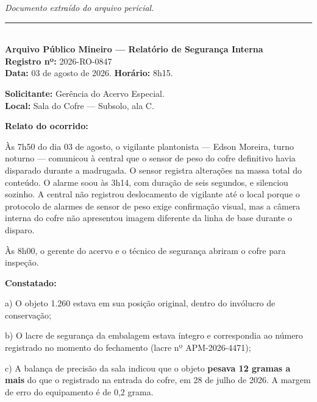 
\noindent \textit{Documento extraído do arquivo pericial.}

\vspace{0.5em}\noindent\rule{\textwidth}{0.5pt}\vspace{0.5em}

\\[-0.2em]

\noindent \textbf{Arquivo Público Mineiro --- Relatório de Segurança Interna}\\
\noindent \textbf{Registro nº:} 2026-RO-0847\\
\noindent\textbf{Data:} 03 de agosto de 2026. \textbf{Horário:} 8h15.

\noindent \textbf{Solicitante:} Gerência do Acervo Especial.\\
\noindent \textbf{Local:} Sala do Cofre --- Subsolo, ala C.

\noindent \textbf{Relato do ocorrido:}

\noindent Às 7h50 do dia 03 de agosto, o vigilante plantonista --- Edson Moreira, turno noturno --- comunicou à central que o sensor de peso do cofre definitivo havia disparado durante a madrugada. O sensor registra alterações na massa total do conteúdo. O alarme soou às 3h14, com duração de seis segundos, e silenciou sozinho. A central não registrou deslocamento de vigilante até o local porque o protocolo de alarmes de sensor de peso exige confirmação visual, mas a câmera interna do cofre não apresentou imagem diferente da linha de base durante o disparo.

\noindent Às 8h00, o gerente do acervo e o técnico de segurança abriram o cofre para inspeção.

\noindent \textbf{Constatado:}

\noindent a) O objeto 1.260 estava em sua posição original, dentro do invólucro de conservação;

\noindent b) O lacre de segurança da embalagem estava íntegro e correspondia ao número registrado no momento do fechamento (lacre nº APM-2026-4471);

\noindent c) A balança de precisão da sala indicou que o objeto \textbf{pesava 12 gramas a mais} do que o registrado na entrada do cofre, em 28 de julho de 2026. A margem de erro do equipamento é de 0,2 grama.

